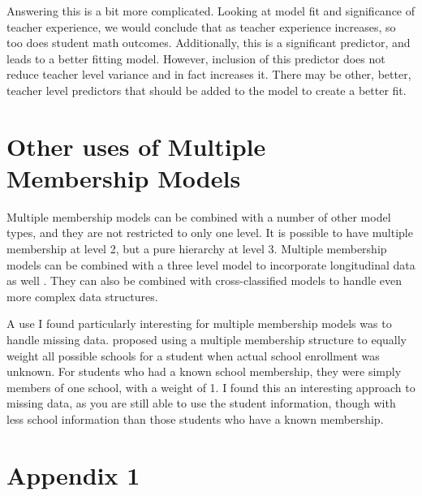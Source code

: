 \documentclass[
]{book}
\begin{document}
Answering this is a bit more complicated. Looking at model fit and significance of teacher experience, we would conclude that as teacher experience increases, so too does student math outcomes. Additionally, this is a significant predictor, and leads to a better fitting model. However, inclusion of this predictor does not reduce teacher level variance and in fact increases it. There may be other, better, teacher level predictors that should be added to the model to create a better fit.

\hypertarget{other-uses-of-multiple-membership-models}{%
\chapter{Other uses of Multiple Membership Models}\label{other-uses-of-multiple-membership-models}}

Multiple membership models can be combined with a number of other model types, and they are not restricted to only one level. It is possible to have multiple membership at level 2, but a pure hierarchy at level 3. Multiple membership models can be combined with a three level model to incorporate longitudinal data as well \citep[for example][]{Leroux}. They can also be combined with cross-classified models \citep[eg.][\citet{Beretvas}]{Browne2001} to handle even more complex data structures.

A use I found particularly interesting for multiple membership models was to handle missing data. \citet{Hill1998} proposed using a multiple membership structure to equally weight all possible schools for a student when actual school enrollment was unknown. For students who had a known school membership, they were simply members of one school, with a weight of 1. I found this an interesting approach to missing data, as you are still able to use the student information, though with less school information than those students who have a known membership.

\hypertarget{appendix-1}{%
\chapter*{Appendix 1}\label{appendix-1}}
\end{document}
